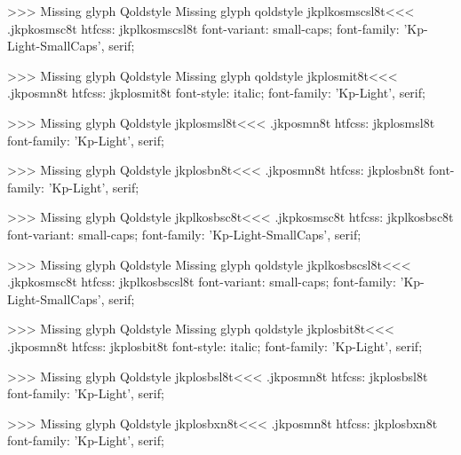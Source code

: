 >>>
Missing glyph	Qoldstyle
Missing glyph	qoldstyle
\<jkplkosmscsl8t\><<<
.jkpkosmsc8t
htfcss:  jkplkosmscsl8t  font-variant: small-caps; font-family: 'Kp-Light-SmallCaps', serif;

>>>
Missing glyph	Qoldstyle
Missing glyph	qoldstyle
\<jkplosmit8t\><<<
.jkposmn8t
htfcss:  jkplosmit8t  font-style: italic; font-family: 'Kp-Light', serif;

>>>
Missing glyph	Qoldstyle
\<jkplosmsl8t\><<<
.jkposmn8t
htfcss:  jkplosmsl8t  font-family: 'Kp-Light', serif;

>>>
Missing glyph	Qoldstyle
\<jkplosbn8t\><<<
.jkposmn8t
htfcss:  jkplosbn8t  font-family: 'Kp-Light', serif;

>>>
Missing glyph	Qoldstyle
\<jkplkosbsc8t\><<<
.jkpkosmsc8t
htfcss:  jkplkosbsc8t  font-variant: small-caps; font-family: 'Kp-Light-SmallCaps', serif;

>>>
Missing glyph	Qoldstyle
Missing glyph	qoldstyle
\<jkplkosbscsl8t\><<<
.jkpkosmsc8t
htfcss:  jkplkosbscsl8t  font-variant: small-caps; font-family: 'Kp-Light-SmallCaps', serif;

>>>
Missing glyph	Qoldstyle
Missing glyph	qoldstyle
\<jkplosbit8t\><<<
.jkposmn8t
htfcss:  jkplosbit8t  font-style: italic; font-family: 'Kp-Light', serif;

>>>
Missing glyph	Qoldstyle
\<jkplosbsl8t\><<<
.jkposmn8t
htfcss:  jkplosbsl8t  font-family: 'Kp-Light', serif;

>>>
Missing glyph	Qoldstyle
\<jkplosbxn8t\><<<
.jkposmn8t
htfcss:  jkplosbxn8t  font-family: 'Kp-Light', serif;

